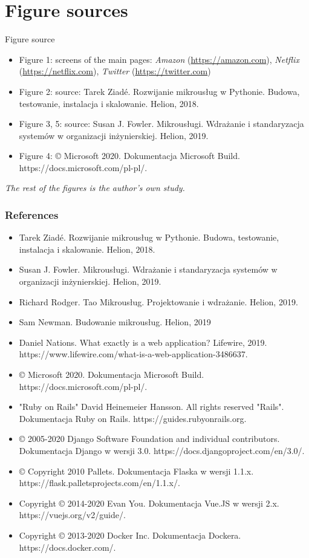 \documentclass{beamer}
\begin{document}
	\section{Figure sources}
	\begin{frame}{Figure source}
		\begin{itemize}
  			\item Figure 1: screens of the main pages: \textit{Amazon} (\url{https://amazon.com}), \textit{Netflix} (\url{https://netflix.com}), \textit{Twitter} (\url{https://twitter.com})
  			\item Figure 2: source: Tarek Ziadé. Rozwijanie mikrousług w Pythonie. Budowa, testowanie, instalacja i skalowanie. Helion, 2018.
  			\item Figure 3, 5: source: Susan J. Fowler. Mikrousługi. Wdrażanie i standaryzacja systemów w organizacji inżynierskiej. Helion, 2019.
  			\item Figure 4:  © Microsoft 2020. Dokumentacja Microsoft Build. https://docs.microsoft.com/pl-pl/.
		\end{itemize}
		
		\textit{The rest of the figures is the author's own study.}
	\end{frame}
	
	\begin{frame}[allowframebreaks]
		\frametitle{References}
	    \begin{itemize}
 			\item Tarek Ziadé. Rozwijanie mikrousług w Pythonie. Budowa, testowanie, instalacja i skalowanie. Helion, 2018.
 			\item Susan J. Fowler. Mikrousługi. Wdrażanie i standaryzacja systemów w organizacji inżynierskiej. Helion, 2019.
 			\item Richard Rodger. Tao Mikrousług. Projektowanie i wdrażanie. Helion, 2019.
 			\item Sam Newman. Budowanie mikrousług. Helion, 2019
 			\item Daniel Nations. What exactly is a web application? Lifewire, 2019. https://www.lifewire.com/what-is-a-web-application-3486637.
 			\item  © Microsoft 2020. Dokumentacja Microsoft Build. https://docs.microsoft.com/pl-pl/.
 			\item "Ruby on Rails" David Heinemeier Hansson. All rights reserved "Rails". Dokumentacja Ruby on Rails. https://guides.rubyonrails.org.
 			\item © 2005-2020 Django Software Foundation and individual contributors. Dokumentacja Django w wersji 3.0. https://docs.djangoproject.com/en/3.0/.
 			\item © Copyright 2010 Pallets. Dokumentacja Flaska w wersji 1.1.x. https://flask.palletsprojects.com/en/1.1.x/.
 			\item Copyright © 2014-2020 Evan You. Dokumentacja Vue.JS w wersji 2.x. https://vuejs.org/v2/guide/.
 			\item Copyright © 2013-2020 Docker Inc. Dokumentacja Dockera. https://docs.docker.com/.
		\end{itemize}
	\end{frame}
\end{document}
